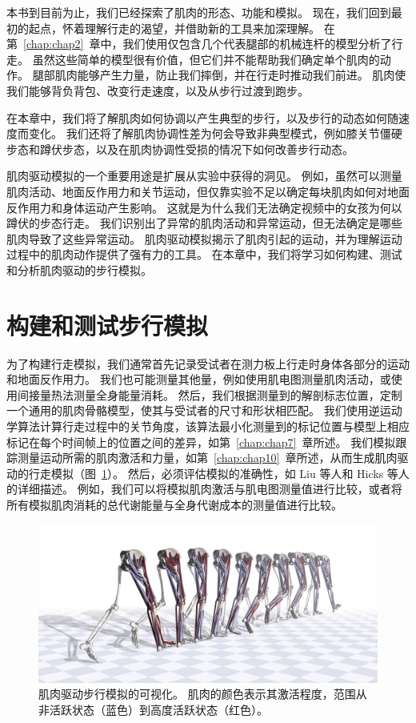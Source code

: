 本书到目前为止，我们已经探索了肌肉的形态、功能和模拟。
现在，我们回到最初的起点，怀着理解行走的渴望，并借助新的工具来加深理解。
在第~\ref{chap:chap2}~章中，我们使用仅包含几个代表腿部的机械连杆的模型分析了行走。
虽然这些简单的模型很有价值，但它们并不能帮助我们确定单个肌肉的动作。
腿部肌肉能够产生力量，防止我们摔倒，并在行走时推动我们前进。
肌肉使我们能够背负背包、改变行走速度，以及从步行过渡到跑步。


在本章中，我们将了解肌肉如何协调以产生典型的步行，以及步行的动态如何随速度而变化。
我们还将了解肌肉协调性差为何会导致非典型模式，例如膝关节僵硬步态和蹲伏步态，以及在肌肉协调性受损的情况下如何改善步行动态。


肌肉驱动模拟的一个重要用途是扩展从实验中获得的洞见。
例如，虽然可以测量肌肉活动、地面反作用力和关节运动，但仅靠实验不足以确定每块肌肉如何对地面反作用力和身体运动产生影响。
这就是为什么我们无法确定视频中的女孩为何以蹲伏的步态行走。
我们识别出了异常的肌肉活动和异常运动，但无法确定是哪些肌肉导致了这些异常运动。
肌肉驱动模拟揭示了肌肉引起的运动，并为理解运动过程中的肌肉动作提供了强有力的工具。
在本章中，我们将学习如何构建、测试和分析肌肉驱动的步行模拟。


\section{构建和测试步行模拟}

为了构建行走模拟，我们通常首先记录受试者在测力板上行走时身体各部分的运动和地面反作用力。
我们也可能测量其他量，例如使用肌电图测量肌肉活动，或使用间接量热法测量全身能量消耗。
然后，我们根据测量到的解剖标志位置，定制一个通用的肌肉骨骼模型，使其与受试者的尺寸和形状相匹配。
我们使用逆运动学算法计算行走过程中的关节角度，该算法最小化测量到的标记位置与模型上相应标记在每个时间帧上的位置之间的差异，如第~\ref{chap:chap7}~章所述。
我们模拟跟踪测量运动所需的肌肉激活和力量，如第~\ref{chap:chap10}~章所述，从而生成肌肉驱动的行走模拟（图~\ref{fig:11_1}）。
然后，必须评估模拟的准确性，如 Liu 等人\cite{liu2008muscle}和 Hicks 等人\cite{hicks2015my}的详细描述。
例如，我们可以将模拟肌肉激活与肌电图测量值进行比较，或者将所有模拟肌肉消耗的总代谢能量与全身代谢成本的测量值进行比较。


\begin{figure}[!htb]
	\centering
	\includegraphics[width=1.0\linewidth]{chap11/11_1}
	\caption{肌肉驱动步行模拟的可视化。
		肌肉的颜色表示其激活程度，范围从非活跃状态（蓝色）到高度活跃状态（红色）\cite{zajac1993muscle}。 \label{fig:11_1}}
\end{figure}


